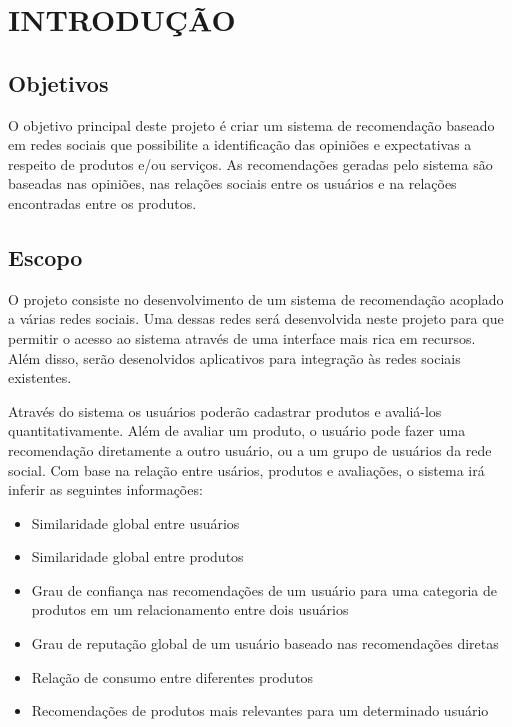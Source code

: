 \chapter{INTRODUÇÃO}

\section{Objetivos}

     O objetivo principal deste projeto é criar um sistema de recomendação baseado em redes sociais que possibilite a identificação das opiniões e expectativas a respeito de produtos e/ou serviços. As recomendações geradas pelo sistema são baseadas nas opiniões, nas relações sociais entre os usuários e na relações encontradas entre os produtos.

\section{Escopo}

	O projeto consiste no desenvolvimento de um sistema de recomendação acoplado a várias redes sociais. Uma dessas redes será desenvolvida neste projeto para que permitir o acesso ao sistema através de uma interface mais rica em recursos. Além disso, serão desenolvidos aplicativos para integração às redes sociais existentes.

	Através do sistema os usuários poderão cadastrar produtos e avaliá-los quantitativamente. Além de avaliar um produto, o usuário pode fazer uma recomendação diretamente a outro usuário, ou a um grupo de usuários da rede social. Com base na relação entre usários, produtos e avaliações, o sistema irá inferir as seguintes informações:
\begin{itemize}

	\item Similaridade global entre usuários

	\item Similaridade global entre produtos

	\item Grau de confiança nas recomendações de um usuário para uma categoria de produtos em um relacionamento entre dois usuários

	\item Grau de reputação global de um usuário baseado nas recomendações diretas

	\item Relação de consumo entre diferentes produtos

	\item Recomendações de produtos mais relevantes para um determinado usuário
\end{itemize}



